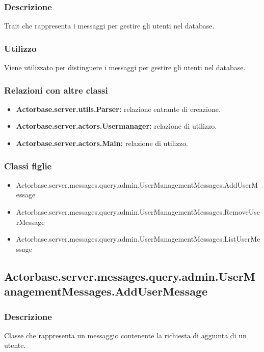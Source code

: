 \documentclass[a4paper]{article}
\begin{document}
			\subsubsection{Descrizione}
				Trait che rappresenta i messaggi per gestire gli utenti nel database.
				
			\subsubsection{Utilizzo}
				Viene utilizzato per distinguere i messaggi per gestire gli utenti nel database.
				
			\subsubsection{Relazioni con altre classi}
				\begin{itemize}
					\item \textbf{Actorbase.server.utils.Parser:} relazione entrante di creazione.
					\item \textbf{Actorbase.server.actors.Usermanager:} relazione di utilizzo.
					\item \textbf{Actorbase.server.actors.Main:} relazione di utilizzo.
				\end{itemize}
			\subsubsection{Classi figlie}
				\begin{itemize}
					\item Actorbase.server.messages.query.admin.UserManagementMessages.AddUserMessage
					\item Actorbase.server.messages.query.admin.UserManagementMessages.RemoveUserMessage
					\item Actorbase.server.messages.query.admin.UserManagementMessages.ListUserMessage
				\end{itemize}
			
		\subsection{Actorbase.server.messages.query.admin.UserManagementMessages.AddUserMessage}
			\subsubsection{Descrizione}
				Classe che rappresenta un messaggio contenente la richiesta di aggiunta di un utente.
				
\end{document}
